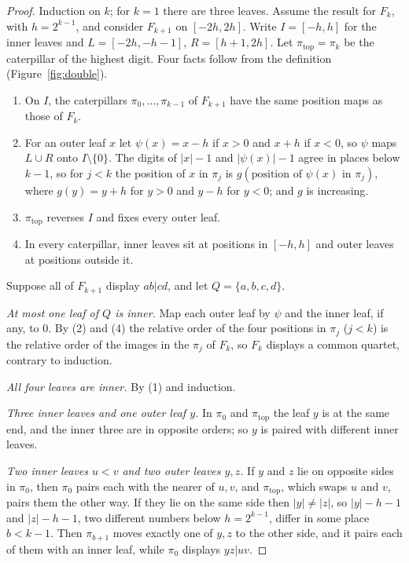 \documentclass[11pt]{amsart}
\theoremstyle{definition}
\begin{document}
\begin{proof}
Induction on $k$; for $k=1$ there are three leaves. Assume the result for $F_k$, with $h=2^{k-1}$, and consider
$F_{k+1}$ on $[-2h,2h]$. Write $I=[-h,h]$ for the inner leaves and $L=[-2h,-h-1]$, $R=[h+1,2h]$. Let
$\pi_{\mathrm{top}}=\pi_{k}$ be the caterpillar of the highest digit. Four facts follow from the definition
(Figure~\ref{fig:double}).
\begin{enumerate}
\item On $I$, the caterpillars $\pi_0,\dots,\pi_{k-1}$ of $F_{k+1}$ have the same position maps as those of $F_k$.
\item For an outer leaf $x$ let $\psi(x)=x-h$ if $x>0$ and $x+h$ if $x<0$, so $\psi$ maps $L\cup R$ onto
$I\setminus\{0\}$. The digits of $|x|-1$ and $|\psi(x)|-1$ agree in places below $k-1$, so for $j<k$ the position
of $x$ in $\pi_j$ is $g(\text{position of }\psi(x)\text{ in }\pi_j)$, where $g(y)=y+h$ for $y>0$ and $y-h$ for
$y<0$; and $g$ is increasing.
\item $\pi_{\mathrm{top}}$ reverses $I$ and fixes every outer leaf.
\item In every caterpillar, inner leaves sit at positions in $[-h,h]$ and outer leaves at positions outside it.
\end{enumerate}
Suppose all of $F_{k+1}$ display $ab|cd$, and let $Q=\{a,b,c,d\}$.

\emph{At most one leaf of $Q$ is inner.} Map each outer leaf by $\psi$ and the inner leaf, if any, to $0$. By (2)
and (4) the relative order of the four positions in $\pi_j$ ($j<k$) is the relative order of the images in the
$\pi_j$ of $F_k$, so $F_k$ displays a common quartet, contrary to induction.

\emph{All four leaves are inner.} By (1) and induction.

\emph{Three inner leaves and one outer leaf $y$.} In $\pi_0$ and $\pi_{\mathrm{top}}$ the leaf $y$ is at the same
end, and the inner three are in opposite orders; so $y$ is paired with different inner leaves.

\emph{Two inner leaves $u<v$ and two outer leaves $y,z$.} If $y$ and $z$ lie on opposite sides in $\pi_0$, then
$\pi_0$ pairs each with the nearer of $u,v$, and $\pi_{\mathrm{top}}$, which swaps $u$ and $v$, pairs them the other
way. If they lie on the same side then $|y|\ne|z|$, so $|y|-h-1$ and $|z|-h-1$, two different numbers below
$h=2^{k-1}$, differ in some place $b<k-1$. Then $\pi_{b+1}$ moves exactly one of $y,z$ to the other side, and it pairs
each of them with an inner leaf, while $\pi_0$ displays $yz|uv$.
\end{proof}
\end{document}
